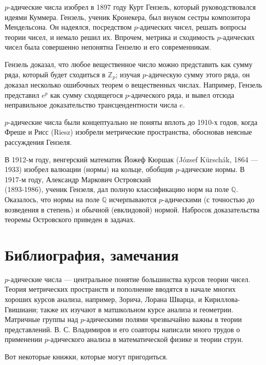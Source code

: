 \documentclass[12pt]{book}
\def\Z{{\mathbb Z}}
\def\Q{{\mathbb Q}}
\theoremstyle{upshape}
\theoremstyle{generic}
\theoremstyle{upshapenonumber}
\newcommand{\следствие}{%
     \refstepcounter{teorema}
     {\noindent\bf Следствие \thechapter.\arabic{teorema}:\ }}
\newcommand{\пример}{%
     \refstepcounter{teorema}
     {\noindent\bf Пример \thechapter.\arabic{teorema}:\ }}
\newcommand{\лемма}{%
     \refstepcounter{teorema}
     {\noindent\bf Лемма \thechapter.\arabic{teorema}:\ }}
\newcommand{\теорема}{%
     \refstepcounter{teorema}
     {\noindent\bf Теорема \thechapter.\arabic{teorema}:\ }}
\newcommand{\утверждение}{%
     \refstepcounter{teorema}
     {\noindent\bf Утверждение \thechapter.\arabic{teorema}:\ }}
\begin{document}
$p$-адические числа изобрел в 1897 году Курт Гензель,
который руководствовался идеями Куммера. 
Гензель, ученик Кронекера,  был внуком сестры
композитора Мендельсона. Он надеялся, посредством
$p$-адических чисел, решать вопросы теории чисел,
и немало решил их. Впрочем, метрика и сходимость
$p$-адических чисел была совершенно непонятна
Гензелю и его современникам.

Гензель доказал, что любое вещественное
число можно представить как сумму ряда,
который будет сходиться в $\Z_p$; изучая
$p$-адическую сумму этого ряда, он доказал
несколько ошибочных теорем о вещественных числах.
Например, Гензель представил $e^p$ как сумму
сходящегося $p$-адического ряда, и вывел
отсюда неправильное доказательство 
трансцендентности числа $e$. 

$p$-адические числа были концептуально не поняты 
вплоть до 1910-х годов, когда Фреше и Рисс (Riesz)
изобрели метрические пространства, обосновав
неясные рассуждения Гензеля.

В 1912-м году, венгерский математик Йожеф
Кюршак (J\'ozsef K\"ur\-sch\'ak, 1864 --- 1933)
изобрел валюации (нормы) на кольце, обобщив 
$p$-адические нормы. В 1917-м году, Александр
Маркович Островский \\(1893-1986), ученик Гензеля,
дал полную классификацию норм на поле $\Q$.
Оказалось, что нормы на поле $\Q$ исчерпываются $p$-адическими
(с точностью до возведения в степень) и обычной
(евклидовой) нормой. Набросок доказательства
теоремы Островского приведен в задачах. 

\section{Библиография, замечания}

 $p$-адические числа --- центральное понятие большинства
курсов теории чисел. Теория метрических пространств
и пополнение вводятся в начале многих хороших
курсов анализа, например, Зорича, Лорана Шварца,
и Кириллова-Гвишиани; также их изучают в матшкольном
курсе анализа и геометрии. Матричные группы над
$p$-адическими полями чрезвычайно важны в теории
представлений. В. С. Владимиров
и его соавторы написали много трудов о применении
$p$-адического анализа в математической физике 
и теории струн.

Вот некоторые книжки, 
которые могут пригодиться.
\end{document}
